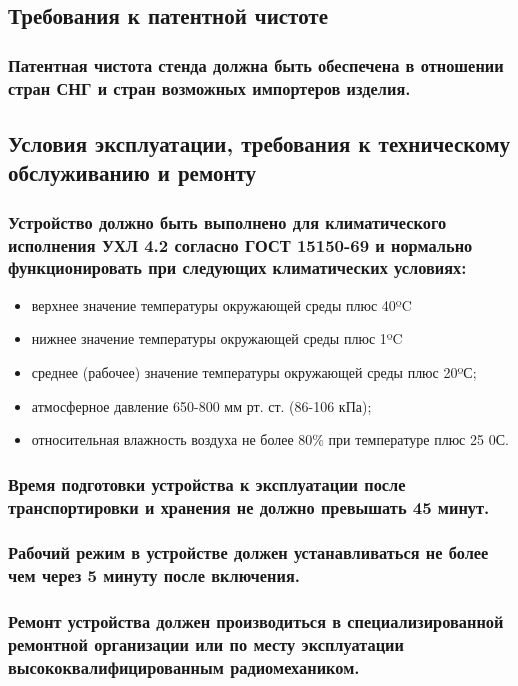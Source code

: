 \documentclass[a4paper]{bsuir-tor}
\begin{document}
\subsection{Требования к патентной чистоте}

\subsubsection{Патентная чистота стенда должна быть обеспечена
  в отношении стран СНГ и стран возможных импортеров изделия.}

\subsection{Условия эксплуатации,
  требования к техническому обслуживанию и ремонту}

\subsubsection{Устройство должно быть выполнено для климатического
  исполнения УХЛ 4.2 согласно ГОСТ 15150-69
  и нормально функционировать при следующих климатических условиях:}

\begin{itemize}
\item верхнее значение температуры окружающей среды плюс 40ºC
\item нижнее значение температуры окружающей среды плюс 1ºC 
\item среднее (рабочее) значение температуры окружающей среды плюс 20ºС;  
\item атмосферное давление 650-800 мм рт. ст. (86-106 кПа);
\item относительная влажность воздуха не более 80\% при темпера­туре плюс 25 0С.
\end{itemize}

\subsubsection{Время подготовки устройства к эксплуатации после
  транспортировки и хранения не должно превышать 45 минут.}

\subsubsection{Рабочий режим в устройстве должен устанавливаться не более чем через 5 минуту после включения.}

\subsubsection{Ремонт устройства должен производиться в
  специализированной ремонтной организации или по месту эксплуатации
  высококвалифицированным радиомехаником.}
\end{document}
